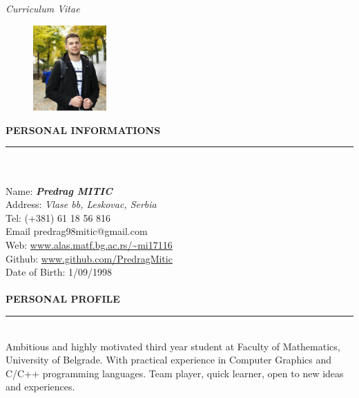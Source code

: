 \documentclass{article}
\begin{document}
\begin{center}
	\textit{\Huge Curriculum Vitae}   
	\vspace*{1cm}
\end{center}

\begin{figure} 
	\includegraphics[width=0.25\textwidth]{my_pic.jpeg}
\end{figure}

\textbf{\large PERSONAL INFORMATIONS}\\
\color{my_col}\noindent\rule{10cm}{0.8pt}\color{black}\\ \\
Name:  \textbf{\emph{Predrag MITIC}} \\
Address: \emph{Vlase bb, Leskovac, Serbia }\\
Tel: 	(+381) 61 18 56 816 \\
Email	predrag98mitic@gmail.com \\ 
Web:	\url{www.alas.matf.bg.ac.rs/~mi17116} \\
Github:	\url{www.github.com/PredragMitic} \\ 
Date of Birth: 1/09/1998 \\ \\

\textbf{\large PERSONAL PROFILE}\\
\color{my_col}\noindent\rule{15.4cm}{0.6pt}\color{black}\\ 
Ambitious and highly motivated third year student at Faculty of Mathematics, 
University of Belgrade. With practical experience in Computer Graphics and 
C/C++ programming languages. Team player, quick learner, open to new ideas and experiences.\\
\end{document}
